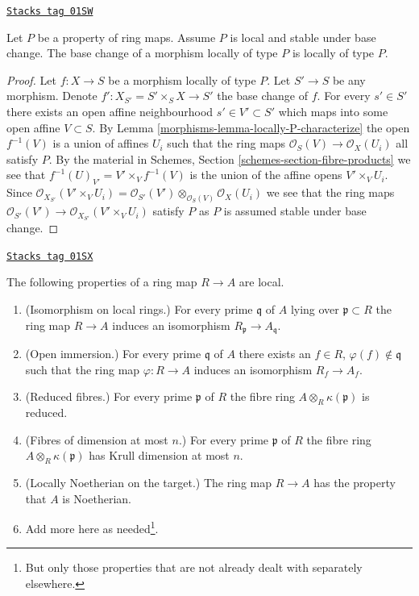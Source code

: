 \begin{lemma}
\label{morphisms-lemma-base-change-type-P}
\href{https://stacks.math.columbia.edu/tag/01SW}{\texttt{Stacks tag 01SW}}

Let $P$ be a property of ring maps.
Assume $P$ is local and stable under base change.
The base change of a morphism locally of type $P$
is locally of type $P$.
\end{lemma}

\begin{proof}

Let $f : X \to S$ be a morphism locally of type $P$.
Let $S' \to S$ be any morphism. Denote
$f' : X_{S'} = S' \times_S X \to S'$ the base change of $f$.
For every $s' \in S'$ there exists an open affine neighbourhood
$s' \in V' \subset S'$ which maps into some open affine $V \subset S$.
By Lemma \ref{morphisms-lemma-locally-P-characterize} the open $f^{-1}(V)$ is a
union of affines $U_i$ such that the ring maps
$\mathcal{O}_S(V) \to \mathcal{O}_X(U_i)$ all satisfy $P$.
By the material in Schemes, Section \ref{schemes-section-fibre-products}
we see that $f^{-1}(U)_{V'} = V' \times_V f^{-1}(V)$ is
the union of the affine opens $V' \times_V U_i$.
Since $\mathcal{O}_{X_{S'}}(V' \times_V U_i) =
\mathcal{O}_{S'}(V') \otimes_{\mathcal{O}_S(V)} \mathcal{O}_X(U_i)$
we see that the ring maps
$\mathcal{O}_{S'}(V') \to \mathcal{O}_{X_{S'}}(V' \times_V U_i)$
satisfy $P$ as $P$ is assumed stable under base change.
\end{proof}

\begin{lemma}
\label{morphisms-lemma-properties-local}
\href{https://stacks.math.columbia.edu/tag/01SX}{\texttt{Stacks tag 01SX}}

The following properties of a ring map $R \to A$ are local.
\begin{enumerate}
\item (Isomorphism on local rings.)
For every prime $\mathfrak q$ of $A$ lying over $\mathfrak p \subset R$
the ring map $R \to A$ induces an isomorphism
$R_{\mathfrak p} \to A_{\mathfrak q}$.
\item (Open immersion.)
For every prime $\mathfrak q$ of $A$ there exists an $f \in R$,
$\varphi(f) \not \in \mathfrak q$ such that the ring map $\varphi : R \to A$
induces an isomorphism $R_f \to A_f$.
\item (Reduced fibres.)
For every prime $\mathfrak p$ of $R$ the fibre ring
$A \otimes_R \kappa(\mathfrak p)$ is reduced.
\item (Fibres of dimension at most $n$.)
For every prime $\mathfrak p$ of $R$ the fibre ring
$A \otimes_R \kappa(\mathfrak p)$ has Krull dimension at most $n$.
\item (Locally Noetherian on the target.)
The ring map $R \to A$ has the property that $A$ is Noetherian.
\item Add more here as needed\footnote{But only those properties
that are not already dealt with separately elsewhere.}.
\end{enumerate}
\end{lemma}

